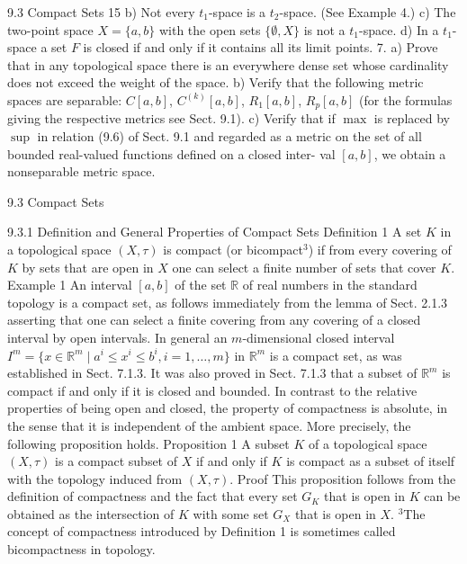 9.3 Compact Sets
15
b) Not every $t_1$-space is a $t_2$-space. (See Example 4.)
c) The two-point space $X = \{a, b\}$ with the open sets $\{\emptyset, X\}$ is not a $t_1$-space.
d) In a $t_1$-space a set $F$ is closed if and only if it contains all its limit points.
7. a) Prove that in any topological space there is an everywhere dense set whose
cardinality does not exceed the weight of the space.
b) Verify that the following metric spaces are separable: $C[a, b]$, $C^{(k)}[a, b]$,
$R_1[a, b]$, $R_p[a, b]$ (for the formulas giving the respective metrics see Sect. 9.1).
c) Verify that if $\max$ is replaced by $\sup$ in relation (9.6) of Sect. 9.1 and regarded
as a metric on the set of all bounded real-valued functions defined on a closed inter-
val $[a, b]$, we obtain a nonseparable metric space.

9.3 Compact Sets

9.3.1 Definition and General Properties of Compact Sets
Definition 1 A set $K$ in a topological space $(X, \tau)$ is compact (or bicompact$^3$) if
from every covering of $K$ by sets that are open in $X$ one can select a finite number
of sets that cover $K$.
Example 1 An interval $[a, b]$ of the set $\mathbb{R}$ of real numbers in the standard topology
is a compact set, as follows immediately from the lemma of Sect. 2.1.3 asserting
that one can select a finite covering from any covering of a closed interval by open
intervals.
In general an $m$-dimensional closed interval $I^m = \{x \in \mathbb{R}^m \mid a^i \leq x^i \leq b^i, i = 1,
\ldots, m\}$ in $\mathbb{R}^m$ is a compact set, as was established in Sect. 7.1.3.
It was also proved in Sect. 7.1.3 that a subset of $\mathbb{R}^m$ is compact if and only if it
is closed and bounded.
In contrast to the relative properties of being open and closed, the property of
compactness is absolute, in the sense that it is independent of the ambient space.
More precisely, the following proposition holds.
Proposition 1 A subset $K$ of a topological space $(X, \tau)$ is a compact subset of $X$ if
and only if $K$ is compact as a subset of itself with the topology induced from $(X, \tau)$.
Proof This proposition follows from the definition of compactness and the fact that
every set $G_K$ that is open in $K$ can be obtained as the intersection of $K$ with some
set $G_X$ that is open in $X$.
$^3$The concept of compactness introduced by Definition 1 is sometimes called bicompactness in
topology.